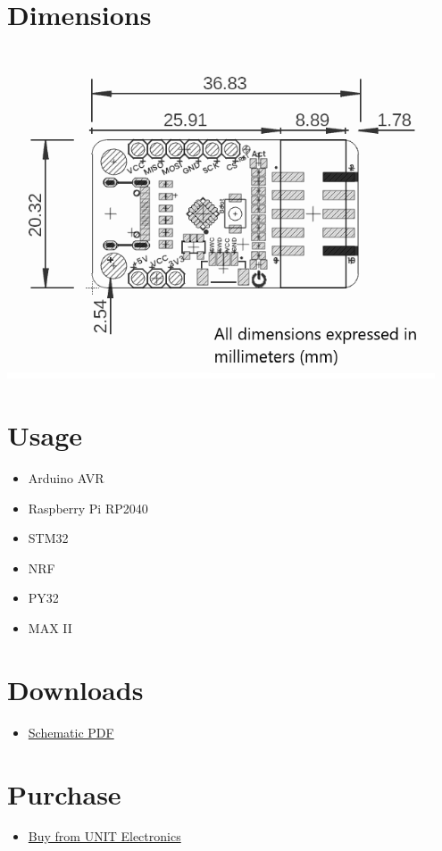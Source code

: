 \documentclass[10pt]{article}
\begin{document}
\section*{Dimensions}
\vspace{1em}
\begin{center}
\includegraphics[width=0.95\textwidth,keepaspectratio]{images/dimensions.png}
\end{center}



\section*{Usage}
\begin{itemize}
\item Arduino AVR
\item Raspberry Pi RP2040
\item STM32
\item NRF
\item PY32
\item MAX II
\end{itemize}

\section*{Downloads}
\begin{itemize}
\begin{itemize}
\item \href{docs/schematic.pdf}{Schematic PDF}
\end{itemize}
\end{itemize}

\section*{Purchase}
\begin{itemize}
\item \href{https://www.uelectronics.com}{Buy from UNIT Electronics}
\end{itemize}
\end{document}
